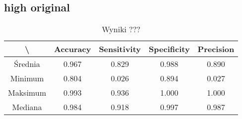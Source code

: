 \subsection{high original}

\begin{table}[H]
	\centering
	\caption{Wyniki ???}
	\vspace{6pt}
	{\footnotesize
		\begin{tabular}{|c|c|c|c|c|}
      \hline \textbackslash & Accuracy & Sensitivity & Specificity & Precision \\
      \hline Średnia & 0.967 & 0.829 & 0.988 & 0.890 \\
      \hline Minimum & 0.804 & 0.026 & 0.894 & 0.027 \\
      \hline Maksimum & 0.993 & 0.936 & 1.000 & 1.000 \\
      \hline Mediana & 0.984 & 0.918 & 0.997 & 0.987 \\
      \hline
		\end{tabular}
	}
  \vspace{0pt}
  \label{Tab:high_original_calculated}
\end{table}



